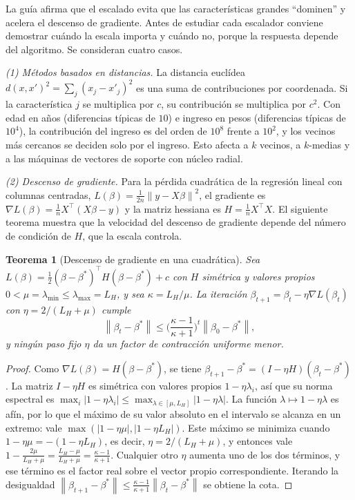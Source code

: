 \documentclass[11pt]{article}
\newtheorem{teorema}{Teorema}[section]
\theoremstyle{definition}
\theoremstyle{remark}
\newcommand{\norm}[1]{\left\lVert #1\right\rVert}
\newcommand{\abs}[1]{\left\lvert #1\right\rvert}
\begin{document}
\noindent La guía afirma que el escalado evita que las características grandes ``dominen'' y acelera el descenso de gradiente. Antes de estudiar cada escalador conviene demostrar cuándo la escala importa y cuándo no, porque la respuesta depende del algoritmo. Se consideran cuatro casos.

\medskip

\noindent \emph{(1) Métodos basados en distancias.} La distancia euclídea $d(x,x')^2=\sum_j(x_j-x'_j)^2$ es una suma de contribuciones por coordenada. Si la característica $j$ se multiplica por $c$, su contribución se multiplica por $c^2$. Con edad en años (diferencias típicas de $10$) e ingreso en pesos (diferencias típicas de $10^4$), la contribución del ingreso es del orden de $10^8$ frente a $10^2$, y los vecinos más cercanos se deciden solo por el ingreso. Esto afecta a $k$ vecinos, a $k$-medias y a las máquinas de vectores de soporte con núcleo radial.

\medskip

\noindent \emph{(2) Descenso de gradiente.} Para la pérdida cuadrática de la regresión lineal con columnas centradas, $L(\beta)=\frac1{2n}\norm{y-X\beta}^2$, el gradiente es $\nabla L(\beta)=\frac1n X^\top(X\beta-y)$ y la matriz hessiana es $H=\frac1nX^\top X$. El siguiente teorema muestra que la velocidad del descenso de gradiente depende del número de condición de $H$, que la escala controla.

\begin{teorema}[Descenso de gradiente en una cuadrática]\label{teo:gd}
\noindent Sea $L(\beta)=\frac12(\beta-\beta^*)^\top H(\beta-\beta^*)+c$ con $H$ simétrica y valores propios $0<\mu=\lambda_{\min}\le\lambda_{\max}=L_H$, y sea $\kappa=L_H/\mu$. La iteración $\beta_{t+1}=\beta_t-\eta\nabla L(\beta_t)$ con $\eta=2/(L_H+\mu)$ cumple
\[
\norm{\beta_{t}-\beta^*}\le\Big(\frac{\kappa-1}{\kappa+1}\Big)^t\norm{\beta_0-\beta^*},
\]
y ningún paso fijo $\eta$ da un factor de contracción uniforme menor.
\end{teorema}
\begin{proof}
\noindent Como $\nabla L(\beta)=H(\beta-\beta^*)$, se tiene $\beta_{t+1}-\beta^*=(I-\eta H)(\beta_t-\beta^*)$. La matriz $I-\eta H$ es simétrica con valores propios $1-\eta\lambda_i$, así que su norma espectral es $\max_i\abs{1-\eta\lambda_i}\le\max_{\lambda\in[\mu,L_H]}\abs{1-\eta\lambda}$. La función $\lambda\mapsto1-\eta\lambda$ es afín, por lo que el máximo de su valor absoluto en el intervalo se alcanza en un extremo: vale $\max(\abs{1-\eta\mu},\abs{1-\eta L_H})$. Este máximo se minimiza cuando $1-\eta\mu=-(1-\eta L_H)$, es decir, $\eta=2/(L_H+\mu)$, y entonces vale $1-\frac{2\mu}{L_H+\mu}=\frac{L_H-\mu}{L_H+\mu}=\frac{\kappa-1}{\kappa+1}$. Cualquier otro $\eta$ aumenta uno de los dos términos, y ese término es el factor real sobre el vector propio correspondiente. Iterando la desigualdad $\norm{\beta_{t+1}-\beta^*}\le\frac{\kappa-1}{\kappa+1}\norm{\beta_t-\beta^*}$ se obtiene la cota.
\end{proof}
\end{document}
